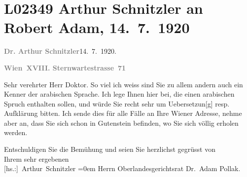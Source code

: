 

\section[Arthur Schnitzler an Robert Adam, 14. 7. 1920]{L02349 Arthur Schnitzler an Robert Adam, 14. 7. 1920}
\nopagebreak{}
\rehead{ }\normalsize\beginnumbering{}
\toendnotes[C]{\smallbreak\pagebreak[2]}
\toendnotes[C]{\smallbreak}
\toendnotes[C]{\smallbreak}
\pstart
           {\pb}\textcolor{gray}{\textbf{Dr. Arthur Schnitzler}}\hfill 14. 7. 1920.\pend
           
\pstart
           \textcolor{gray}{\textbf{Wien XVIII. Sternwartestrasse 71}}\pend
           
\pstart{}Sehr verehrter Herr Doktor.\pend\vspace{0.5em}
\pstart
           So viel ich weiss sind Sie zu allem andern auch ein Kenner der arabischen Sprache.
               Ich lege Ihnen hier \label{K_L02349-1v}\label{K_L02349-1} bei, die
               einen arabischen Spruch enthalten sollen, und würde Sie recht sehr um
                  Uebersetzun{[}g{]} resp. Aufklärung bitten. Ich sende dies für alle
               Fälle an Ihre Wiener Adresse, nehme aber an, dass
               Sie sich schon in Gutenstein befinden, wo Sie
               sich völlig erholen werden.\pend
           
\pstart
           Entschuldigen Sie die Bemühung und seien Sie herzlichst gegrüsst von{\\[\baselineskip]}Ihrem
               sehr ergebenen{\\[\baselineskip]}\spacefill\mbox{{[}hs.:{]} Arthur Schnitzler}\pend
           \leftskip=0em{}
\pstart
           \noindent{}Herrn Oberlandesgerichtsrat Dr. Adam Pollak.\pend
           \endnumbering{}  \newcommand{\dateiname}{L02349}\newcommand{\titel}{Arthur Schnitzler an Robert Adam, 14. 7. 1920}\newcommand{\editorInnen}{Martin Anton Müller und Gerd-Hermann Susen}
